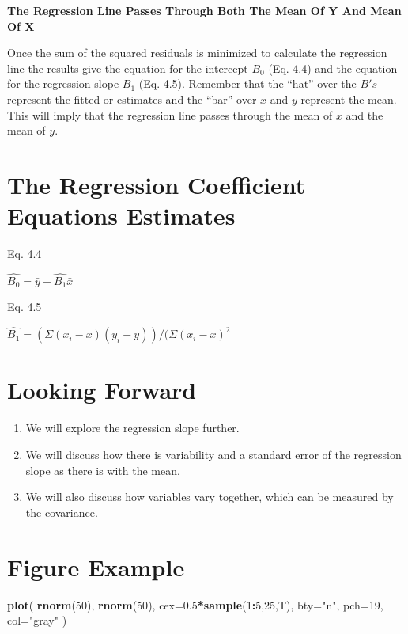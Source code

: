 \documentclass[]{book}
\newenvironment{Shaded}{\begin{snugshade}}{\end{snugshade}}
\newcommand{\DataTypeTok}[1]{\textcolor[rgb]{0.13,0.29,0.53}{#1}}
\newcommand{\DecValTok}[1]{\textcolor[rgb]{0.00,0.00,0.81}{#1}}
\newcommand{\FloatTok}[1]{\textcolor[rgb]{0.00,0.00,0.81}{#1}}
\newcommand{\KeywordTok}[1]{\textcolor[rgb]{0.13,0.29,0.53}{\textbf{#1}}}
\newcommand{\NormalTok}[1]{#1}
\newcommand{\OperatorTok}[1]{\textcolor[rgb]{0.81,0.36,0.00}{\textbf{#1}}}
\newcommand{\StringTok}[1]{\textcolor[rgb]{0.31,0.60,0.02}{#1}}
\theoremstyle{definition}
\theoremstyle{definition}
\theoremstyle{definition}
\theoremstyle{remark}
\begin{document}
\textbf{The Regression Line Passes Through Both The Mean Of Y And Mean
Of X}

Once the sum of the squared residuals is minimized to calculate the
regression line the results give the equation for the intercept
\(B_{0}\) (Eq. 4.4) and the equation for the regression slope \(B_{1}\)
(Eq. 4.5). Remember that the ``hat'' over the \(B's\) represent the
fitted or estimates and the ``bar'' over \(x\) and \(y\) represent the
mean. This will imply that the regression line passes through the mean
of \(x\) and the mean of \(y\).

\hypertarget{the-regression-coefficient-equations-estimates}{%
\section{The Regression Coefficient Equations
Estimates}\label{the-regression-coefficient-equations-estimates}}

Eq. 4.4

\(\hat{B_{0}} = \bar{y}-\hat{B_1}\bar{x}\)

Eq. 4.5

\(\hat{B_{1}} = (\Sigma(x_{i}-\bar{x})({y}_{i}-\bar{y}))/(\Sigma(x_{i}-\bar{x})^2\)

\hypertarget{looking-forward}{%
\section{Looking Forward}\label{looking-forward}}

\begin{enumerate}
\def\labelenumi{\arabic{enumi}.}
\item
  We will explore the regression slope further.
\item
  We will discuss how there is variability and a standard error of the
  regression slope as there is with the mean.
\item
  We will also discuss how variables vary together, which can be
  measured by the covariance.
\end{enumerate}

\hypertarget{figure-example}{%
\section{Figure Example}\label{figure-example}}

\begin{Shaded}
\begin{Highlighting}[]

\KeywordTok{plot}\NormalTok{( }\KeywordTok{rnorm}\NormalTok{(}\DecValTok{50}\NormalTok{), }\KeywordTok{rnorm}\NormalTok{(}\DecValTok{50}\NormalTok{), }\DataTypeTok{cex=}\FloatTok{0.5}\OperatorTok{*}\KeywordTok{sample}\NormalTok{(}\DecValTok{1}\OperatorTok{:}\DecValTok{5}\NormalTok{,}\DecValTok{25}\NormalTok{,T), }\DataTypeTok{bty=}\StringTok{"n"}\NormalTok{, }\DataTypeTok{pch=}\DecValTok{19}\NormalTok{, }\DataTypeTok{col=}\StringTok{"gray"}\NormalTok{ )}
\end{Highlighting}
\end{Shaded}
\end{document}
